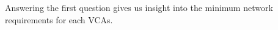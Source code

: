 Answering the first question gives us insight into the minimum network requirements for each VCAs. 










